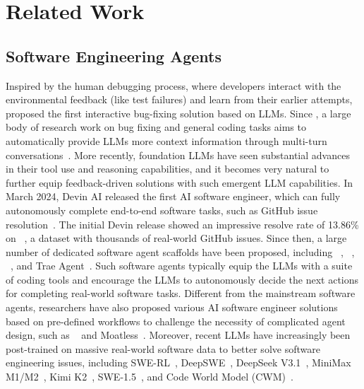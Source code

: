 

\section{Related Work}
\subsection{Software Engineering Agents}
% 
Inspired by the human debugging process, where developers interact with the environmental feedback (like test failures) and learn from their earlier attempts, \chatrepair~\citep{xia2023conversational,xia2024automated} proposed the first interactive bug-fixing solution based on LLMs. Since \chatrepair, a large body of research work on bug fixing and general coding tasks aims to automatically provide LLMs more context information through multi-turn conversations~\citep{chen2023teaching, kong2025contrastrepair, yuan2024evaluating}. More recently, foundation LLMs have seen substantial advances in their tool use and reasoning capabilities, and it becomes very natural to further equip feedback-driven solutions with such emergent LLM capabilities. In March 2024, Devin AI released the first AI software engineer, which can fully autonomously complete end-to-end software tasks, such as GitHub issue resolution~\citep{devin}. The initial Devin release showed an impressive resolve rate of 13.86\% on \swebench~\citep{jimenez2023swe}, a dataset with thousands of real-world GitHub issues. Since then, a large number of dedicated software agent scaffolds have been proposed, including \sweagent~\citep{yang2024swe}, \openhands~\citep{wang2024openhands}, \acr~\citep{zhang2024autocoderover}, and Trae Agent~\citep{liu2024marscode}. Such software agents typically equip the LLMs with a suite of coding tools and encourage the LLMs to autonomously decide the next actions for completing real-world software tasks. Different from the mainstream software agents, researchers have also proposed various AI software engineer solutions based on pre-defined workflows to challenge the necessity of complicated agent design, such as \agentless~\citep{xia2024agentless} and Moatless~\citep{moatless}. Moreover, recent LLMs have increasingly been post-trained on massive real-world software data to better solve software engineering issues, including SWE-RL~\cite{wei2025swerl}, DeepSWE~\cite{luodeepswe}, DeepSeek V3.1~\cite{deepseekv31}, MiniMax M1/M2~\cite{chen2025minimax}, Kimi K2~\cite{team2025kimi}, SWE-1.5~\cite{swe15}, and Code World Model (CWM)~\cite{carbonneaux2025cwm}.

